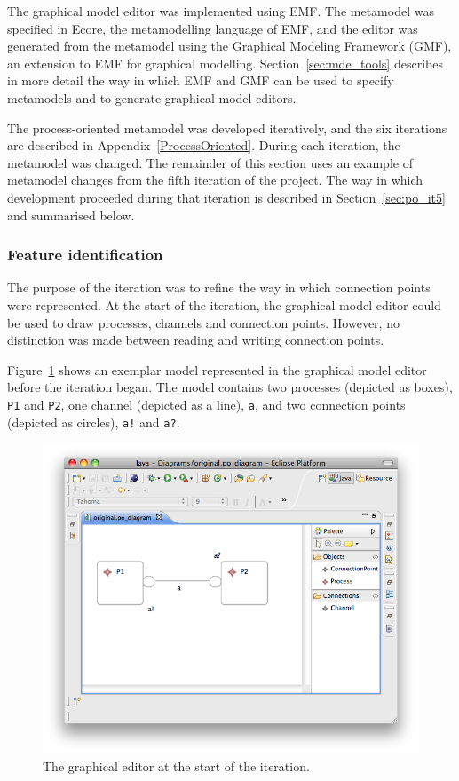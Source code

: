 The graphical model editor was implemented using EMF. The metamodel was specified in Ecore, the metamodelling language of EMF, and the editor was generated from the metamodel using the Graphical Modeling Framework (GMF), an extension to EMF for graphical modelling. Section~\ref{sec:mde_tools} describes in more detail the way in which EMF and GMF can be used to specify metamodels and to generate graphical model editors.

The process-oriented metamodel was developed iteratively, and the six iterations are described in Appendix~\ref{ProcessOriented}. During each iteration, the metamodel was changed. The remainder of this section uses an example of metamodel changes from the fifth iteration of the project. The way in which development proceeded during that iteration is described in Section~\ref{sec:po_it5} and summarised below.

\subsubsection{Feature identification}
The purpose of the iteration was to refine the way in which connection points were represented. At the start of the iteration, the graphical model editor could be used to draw processes, channels and connection points. However, no distinction was made between reading and writing connection points.

Figure~\ref{fig:po_original_editor} shows an exemplar model represented in the graphical model editor before the iteration began. The model contains two processes (depicted as boxes), \texttt{P1} and \texttt{P2}, one channel (depicted as a line), \texttt{a}, and two connection points (depicted as circles), \texttt{a!} and \texttt{a?}.

\begin{figure}[htbp]
	\centering
	\includegraphics[width=13.5cm]{6.Evaluation/images/user_driven/po_original_editor.png}
	\caption{The graphical editor at the start of the iteration.}
	\label{fig:po_original_editor}
\end{figure}


